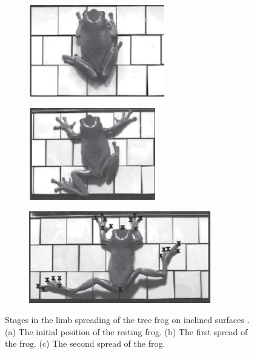 \begin{figure}[h!] 
\begin{subfigure}{0.32\textwidth}
    \centering
    \includegraphics[width=\linewidth, height=4cm, angle=0]{images/limb spreading/Tree_frog_spread_rest_endlein2013sticking.png}
    \caption{}
    \label{fig:limb_spreading_rest}
\end{subfigure}
\hfill
\begin{subfigure}{0.32\textwidth}
    \centering
    \includegraphics[width=\linewidth, height=4cm, angle=0]{images/limb spreading/Tree_frog_first_spread_endlein2013sticking.png}
    \caption{}
    \label{fig:limb_spreading_first_spread}
\end{subfigure}
\begin{subfigure}{0.32\textwidth}
    \centering
    \includegraphics[width=\linewidth, height=4cm, angle=0]{images/limb spreading/Tree_frog_second_spread_endlein2013sticking.png}
    \caption{}
    \label{fig:limb_spreading_second_spread}
\end{subfigure}
  \caption{Stages in the limb spreading of the tree frog on inclined surfaces \cite{endlein2013sticking}. (a) The initial position of the resting frog. (b) The first spread of the frog. (c) The second spread of the frog.}
  \label{fig:tree_frog_limb_spreading}
\end{figure}

